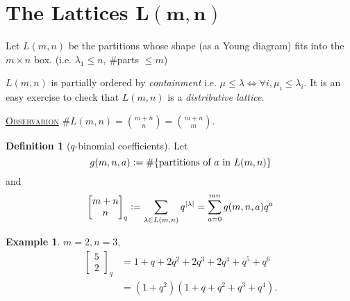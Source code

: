 \documentclass{report}
\newcommand{\qbin}[2]{\begin{bmatrix}{#1}\\ {#2}\end{bmatrix}_q}
\newcommand{\defeq}{\vcentcolon=}
\newcommand{\fancyem}[1]{\underline{\textsc{#1}}}
\theoremstyle{definition}
\newtheorem{definition}{Definition}[section]
\newtheorem{example}{Example}[section]
\theoremstyle{remark}
\numberwithin{equation}{section}
\newcommand*\ttlmath[2]{\texorpdfstring{$\boldsymbol{#1}$}{#2}}
\begin{document}
\section{The Lattices \ttlmath{L(m, n)}{L(m, n)}}
Let $L(m, n)$ be the partitions whose shape (as a Young diagram) fits into the $m \times n$ box. (i.e. $\lambda_1 \leq n$, $\#$parts $\leq m$)

$L(m, n)$ is partially ordered by \emph{containment} i.e. $\mu \leq \lambda \iff \forall i, \mu_i \leq \lambda_i$.
It is an easy exercise to check that $L(m, n)$ is a \emph{distributive lattice}.

\fancyem{Observarion} $\#L(m, n) = \binom{m+n}{n} = \binom{m + n}{m}$.

\begin{definition}[$q$-binomial coefficients]\label{def:qbin}
    Let \[g(m, n, a) \defeq \#\{\text{partitions of $a$ in $L(m, n)$}\}\] and \[
        \qbin{m+n}{n} \defeq \sum_{\lambda \in L(m, n)}q^{|\lambda|} = \sum_{a = 0}^{mn} g(m, n, a)q^a    
    \]
\end{definition}
\begin{example}
    $m = 2, n = 3,$ \begin{align*}
        \qbin{5}{2} & = 1 + q + 2q^2 + 2q^3 + 2q^4 + q^5 + q^6 \\
        & = (1 + q^2)(1 + q + q^2 + q^3 + q^4).
    \end{align*}
\end{example}
\end{document}
